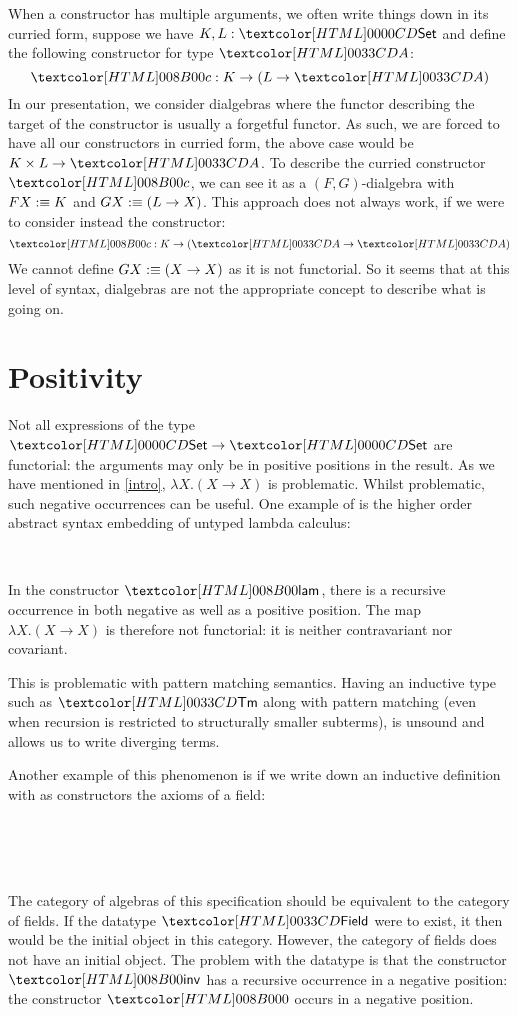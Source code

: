 When a constructor has multiple arguments, we often write things down
in its curried form, \eg suppose we have $K, L : \Set$ and define the
following constructor for type $\Aty$:
$$
\Ac : K \to (L \to \Aty)
$$
In our presentation, we consider dialgebras where the functor
describing the target of the constructor is usually a forgetful
functor. As such, we are forced to have all our constructors in
curried form, \eg the above case would be $K \times L \to \Aty$. To
describe the curried constructor $\Ac$, we can see it as a
$(F,G)$-dialgebra with $F X :\equiv K$ and $G X :\equiv (L \to X)$.
This approach does not always work, if we were to consider instead the
constructor:
$$
\Ac : K \to (\Aty \to \Aty)
$$
We cannot define $G X :\equiv (X \to X)$ as it is not functorial. So
it seems that at this level of syntax, dialgebras are not the
appropriate concept to describe what is going on.

\section{Positivity}
\label{positivity}

Not all expressions of the type $\Set \to \Set$ are functorial: the
arguments may only be in positive positions in the result. As we have
mentioned in \cref{intro}, $\lambda X . (X \to X)$ is
problematic. Whilst problematic, such negative occurrences can be
useful. One example of is the higher order abstract syntax embedding
of untyped lambda calculus:
%
\begin{datatype}{\tttmty}{\Set}
  \constr{\ttapp}{\tttmty \to \tttmty \to \tttmty} \\
  \constr{\ttlam}{(\tttmty \to \tttmty) \to \tttmty}
\end{datatype}
%
In the constructor $\ttlam$, there is a recursive occurrence in both
negative as well as a positive position. The map
$\lambda X . (X \to X)$ is therefore not functorial: it is neither
contravariant nor covariant. 

This is problematic with pattern matching semantics. Having an
inductive type such as $\tttmty$ along with pattern matching (even
when recursion is restricted to structurally smaller subterms), is
unsound and allows us to write diverging terms.

Another example of this phenomenon is if we write down an inductive
definition with as constructors the axioms of a field:
%
\begin{datatype}{\fieldty}{\Set}
  \constr{\fieldzero}{\fieldty} \\
  \constrdots \\
   \\
  \constrdots
\end{datatype}
%
The category of algebras of this specification should be equivalent to
the category of fields. If the datatype $\fieldty$ were to exist, it
then would be the initial object in this category. However, the
category of fields does not have an initial object. The problem with
the datatype is that the constructor $\fieldinv$ has a recursive
occurrence in a negative position: the constructor $\fieldzero$ occurs
in a negative position.

